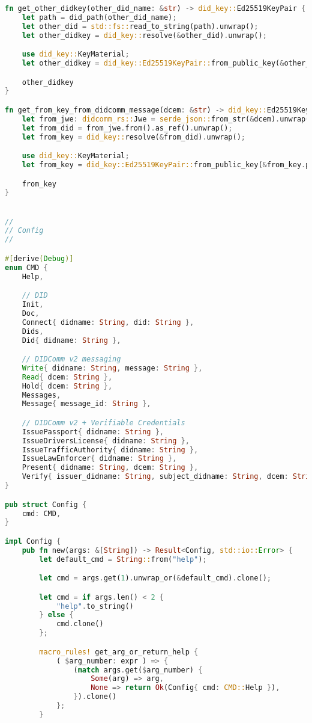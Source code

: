 \begin{lstlisting}[language=Rust]
fn get_other_didkey(other_did_name: &str) -> did_key::Ed25519KeyPair {
    let path = did_path(other_did_name);
    let other_did = std::fs::read_to_string(path).unwrap();
    let other_didkey = did_key::resolve(&other_did).unwrap();

    use did_key::KeyMaterial;
    let other_didkey = did_key::Ed25519KeyPair::from_public_key(&other_didkey.public_key_bytes());

    other_didkey
}

fn get_from_key_from_didcomm_message(dcem: &str) -> did_key::Ed25519KeyPair {
    let from_jwe: didcomm_rs::Jwe = serde_json::from_str(&dcem).unwrap();
    let from_did = from_jwe.from().as_ref().unwrap();
    let from_key = did_key::resolve(&from_did).unwrap();

    use did_key::KeyMaterial;
    let from_key = did_key::Ed25519KeyPair::from_public_key(&from_key.public_key_bytes());

    from_key
}


//
// Config
//

#[derive(Debug)]
enum CMD {
    Help,

    // DID
    Init,
    Doc,
    Connect{ didname: String, did: String },
    Dids,
    Did{ didname: String },

    // DIDComm v2 messaging
    Write{ didname: String, message: String },
    Read{ dcem: String },
    Hold{ dcem: String },
    Messages,
    Message{ message_id: String },

    // DIDComm v2 + Verifiable Credentials
    IssuePassport{ didname: String },
    IssueDriversLicense{ didname: String },
    IssueTrafficAuthority{ didname: String },
    IssueLawEnforcer{ didname: String },
    Present{ didname: String, dcem: String },
    Verify{ issuer_didname: String, subject_didname: String, dcem: String },
}

pub struct Config {
    cmd: CMD,
}

impl Config {
    pub fn new(args: &[String]) -> Result<Config, std::io::Error> {
        let default_cmd = String::from("help");

        let cmd = args.get(1).unwrap_or(&default_cmd).clone();

        let cmd = if args.len() < 2 {
            "help".to_string()
        } else {
            cmd.clone()
        };

        macro_rules! get_arg_or_return_help {
            ( $arg_number: expr ) => {
                (match args.get($arg_number) {
                    Some(arg) => arg,
                    None => return Ok(Config{ cmd: CMD::Help }),
                }).clone()
            };
        }


\end{lstlisting}
